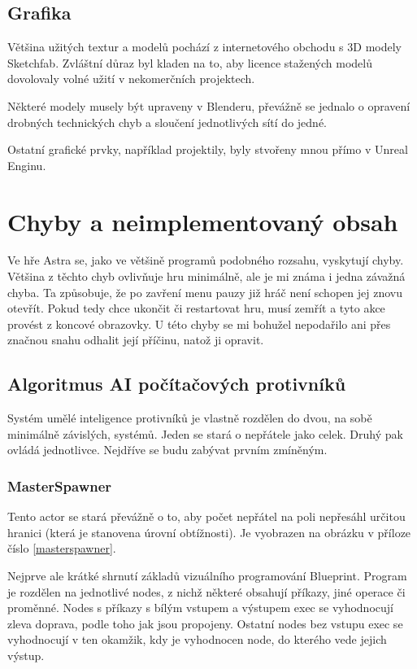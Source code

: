 \documentclass[12pt,a4paper,hidelinks]{article}
\begin{document}
\subsection{Grafika}
Většina užitých textur a modelů pochází z internetového obchodu s 3D modely Sketchfab\cite{sketchfab}. Zvláštní důraz byl kladen na to, aby licence stažených modelů dovolovaly volné užití v nekomerčních projektech.

Některé modely musely být upraveny v Blenderu, převážně se jednalo o opravení drobných technických chyb a sloučení jednotlivých sítí do jedné.

Ostatní grafické prvky, například projektily, byly stvořeny mnou přímo v Unreal Enginu.

\section{Chyby a neimplementovaný obsah}
Ve hře Astra se, jako ve většině programů podobného rozsahu, vyskytují chyby. Většina z těchto chyb ovlivňuje hru minimálně, ale je mi známa i jedna závažná chyba. Ta způsobuje, že po zavření menu pauzy již hráč není schopen jej znovu otevřít. Pokud tedy chce ukončit či restartovat hru, musí zemřít a tyto akce provést z koncové obrazovky. U této chyby se mi bohužel nepodařilo ani přes značnou snahu odhalit její příčinu, natož ji opravit.

\subsection{Algoritmus AI počítačových protivníků}
Systém umělé inteligence protivníků je vlastně rozdělen do dvou, na sobě minimálně závislých, systémů. Jeden se stará o nepřátele jako celek. Druhý pak ovládá jednotlivce. Nejdříve se budu zabývat prvním zmíněným.


\subsubsection{MasterSpawner}
Tento actor se stará převážně o to, aby počet nepřátel na poli nepřesáhl určitou hranici (která je stanovena úrovní obtížnosti). Je vyobrazen na obrázku v příloze číslo \ref{masterspawner}.

Nejprve ale krátké shrnutí základů vizuálního programování Blueprint.\cite{uedocs:blueprint} Program je rozdělen na jednotlivé nodes\cite{uedocs:nodes}, z nichž některé obsahují příkazy, jiné operace či proměnné. Nodes s příkazy s bílým vstupem a výstupem exec se vyhodnocují zleva doprava, podle toho jak jsou propojeny. Ostatní nodes bez vstupu exec se vyhodnocují v ten okamžik, kdy je vyhodnocen node, do kterého vede jejich výstup.
\end{document}
